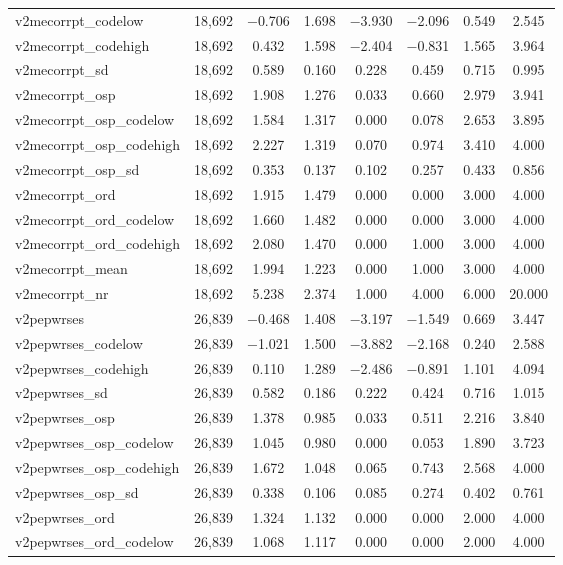 \begin{table}[!htbp]
\begin{tabular}{@{\extracolsep{5pt}}lccccccc}
v2mecorrpt\_codelow & 18,692 & $-$0.706 & 1.698 & $-$3.930 & $-$2.096 & 0.549 & 2.545 \\ 
v2mecorrpt\_codehigh & 18,692 & 0.432 & 1.598 & $-$2.404 & $-$0.831 & 1.565 & 3.964 \\ 
v2mecorrpt\_sd & 18,692 & 0.589 & 0.160 & 0.228 & 0.459 & 0.715 & 0.995 \\ 
v2mecorrpt\_osp & 18,692 & 1.908 & 1.276 & 0.033 & 0.660 & 2.979 & 3.941 \\ 
v2mecorrpt\_osp\_codelow & 18,692 & 1.584 & 1.317 & 0.000 & 0.078 & 2.653 & 3.895 \\ 
v2mecorrpt\_osp\_codehigh & 18,692 & 2.227 & 1.319 & 0.070 & 0.974 & 3.410 & 4.000 \\ 
v2mecorrpt\_osp\_sd & 18,692 & 0.353 & 0.137 & 0.102 & 0.257 & 0.433 & 0.856 \\ 
v2mecorrpt\_ord & 18,692 & 1.915 & 1.479 & 0.000 & 0.000 & 3.000 & 4.000 \\ 
v2mecorrpt\_ord\_codelow & 18,692 & 1.660 & 1.482 & 0.000 & 0.000 & 3.000 & 4.000 \\ 
v2mecorrpt\_ord\_codehigh & 18,692 & 2.080 & 1.470 & 0.000 & 1.000 & 3.000 & 4.000 \\ 
v2mecorrpt\_mean & 18,692 & 1.994 & 1.223 & 0.000 & 1.000 & 3.000 & 4.000 \\ 
v2mecorrpt\_nr & 18,692 & 5.238 & 2.374 & 1.000 & 4.000 & 6.000 & 20.000 \\ 
v2pepwrses & 26,839 & $-$0.468 & 1.408 & $-$3.197 & $-$1.549 & 0.669 & 3.447 \\ 
v2pepwrses\_codelow & 26,839 & $-$1.021 & 1.500 & $-$3.882 & $-$2.168 & 0.240 & 2.588 \\ 
v2pepwrses\_codehigh & 26,839 & 0.110 & 1.289 & $-$2.486 & $-$0.891 & 1.101 & 4.094 \\ 
v2pepwrses\_sd & 26,839 & 0.582 & 0.186 & 0.222 & 0.424 & 0.716 & 1.015 \\ 
v2pepwrses\_osp & 26,839 & 1.378 & 0.985 & 0.033 & 0.511 & 2.216 & 3.840 \\ 
v2pepwrses\_osp\_codelow & 26,839 & 1.045 & 0.980 & 0.000 & 0.053 & 1.890 & 3.723 \\ 
v2pepwrses\_osp\_codehigh & 26,839 & 1.672 & 1.048 & 0.065 & 0.743 & 2.568 & 4.000 \\ 
v2pepwrses\_osp\_sd & 26,839 & 0.338 & 0.106 & 0.085 & 0.274 & 0.402 & 0.761 \\ 
v2pepwrses\_ord & 26,839 & 1.324 & 1.132 & 0.000 & 0.000 & 2.000 & 4.000 \\ 
v2pepwrses\_ord\_codelow & 26,839 & 1.068 & 1.117 & 0.000 & 0.000 & 2.000 & 4.000 \\ 

\end{tabular}
\end{table}
